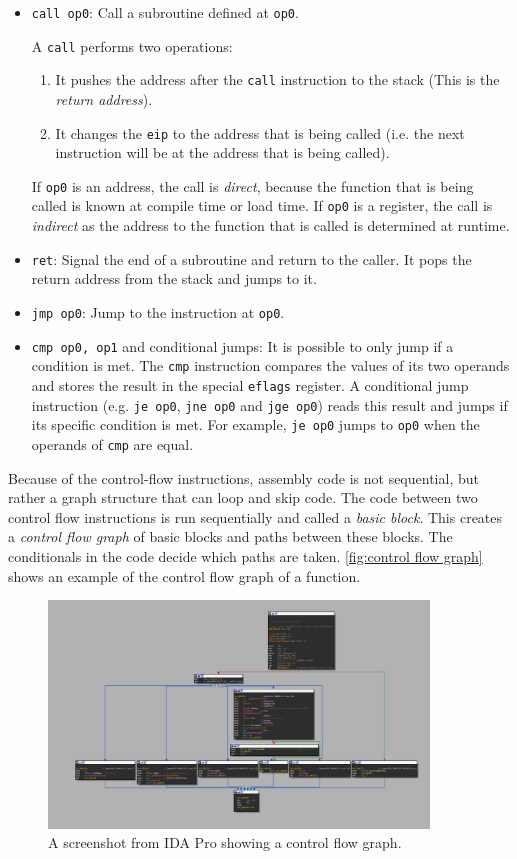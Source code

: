 \begin{itemize}
    \item \texttt{call op0}: Call a subroutine defined at \texttt{op0}.

    A \texttt{call} performs two operations:
    \begin{enumerate}
        \item It pushes the address after the \texttt{call} instruction to the stack (This is the \emph{return address}).
        \item It changes the \texttt{eip} to the address that is being called (i.e. the next instruction will be at the address that is being called).
    \end{enumerate}

    If \texttt{op0} is an address, the call is \emph{direct}, because the function that is being called is known at compile time or load time. If \texttt{op0} is a register, the call is \emph{indirect} as the address to the function that is called is determined at runtime.

    \item \texttt{ret}: Signal the end of a subroutine and return to the caller. It pops the return address from the stack and jumps to it.
    \item \texttt{jmp op0}: Jump to the instruction at \texttt{op0}.
    \item \texttt{cmp op0, op1} and conditional jumps: It is possible to only jump if a condition is met. The \texttt{cmp} instruction compares the values of its two operands and stores the result in the special \texttt{eflags} register. A conditional jump instruction (e.g. \texttt{je op0}, \texttt{jne op0} and \texttt{jge op0}) reads this result and jumps if its specific condition is met. For example, \texttt{je op0} jumps to \texttt{op0} when the operands of \texttt{cmp} are equal.
\end{itemize}

Because of the control-flow instructions, assembly code is not sequential, but rather a graph structure that can loop and skip code. The code between two control flow instructions is run sequentially and called a \emph{basic block}. This creates a \emph{control flow graph} of basic blocks and paths between these blocks. The conditionals in the code decide which paths are taken. \autoref{fig:control flow graph} shows an example of the control flow graph of a function.

\begin{figure}[ht]
    \centering
    \includegraphics[width=0.9\textwidth]{resources/images/control_flow_graph.png}
    \caption{A screenshot from IDA Pro showing a control flow graph.}\label{fig:control flow graph}
\end{figure}
